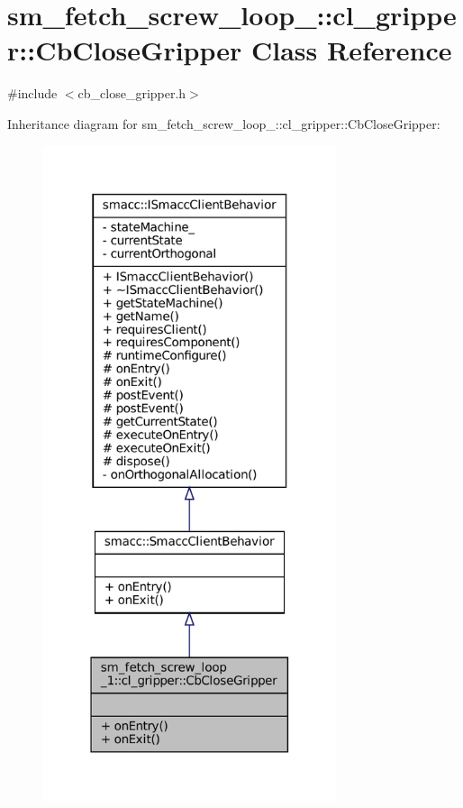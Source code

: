 \hypertarget{classsm__fetch__screw__loop__1_1_1cl__gripper_1_1CbCloseGripper}{}\section{sm\+\_\+fetch\+\_\+screw\+\_\+loop\+\_\+:\+:cl\+\_\+gripper\+:\+:Cb\+Close\+Gripper Class Reference}
\label{classsm__fetch__screw__loop__1_1_1cl__gripper_1_1CbCloseGripper}


{\ttfamily \#include $<$cb\+\_\+close\+\_\+gripper.\+h$>$}



Inheritance diagram for sm\+\_\+fetch\+\_\+screw\+\_\+loop\+\_\+:\+:cl\+\_\+gripper\+:\+:Cb\+Close\+Gripper\+:
\nopagebreak
\begin{figure}[H]
\begin{center}
\leavevmode
\includegraphics[width=244pt]{classsm__fetch__screw__loop__1_1_1cl__gripper_1_1CbCloseGripper__inherit__graph}
\end{center}
\end{figure}


